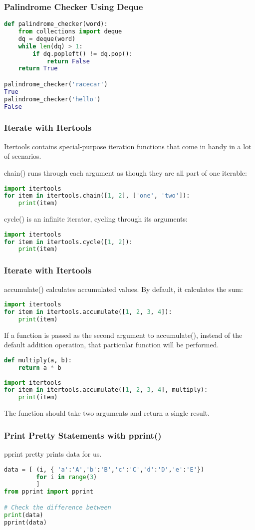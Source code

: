 \documentclass{beamer}
\begin{document}
\begin{frame}[fragile]
\frametitle{Palindrome Checker Using Deque}
\begin{lstlisting}[language=Python]
def palindrome_checker(word):
    from collections import deque
    dq = deque(word)
    while len(dq) > 1:
        if dq.popleft() != dq.pop():
            return False
    return True

palindrome_checker('racecar')
True
palindrome_checker('hello')
False
\end{lstlisting}
\end{frame}

\begin{frame}[fragile]
\frametitle{Iterate with Itertools}
Itertools contains special-purpose iteration functions that come in handy in a lot of scenarios.

chain() runs through each argument as though they are all part of one iterable:

\begin{lstlisting}[language=Python]
import itertools
for item in itertools.chain([1, 2], ['one', 'two']):
	print(item)
\end{lstlisting}

cycle() is an infinite iterator, cycling through its arguments:
\begin{lstlisting}[language=Python]
import itertools
for item in itertools.cycle([1, 2]):
    print(item)
\end{lstlisting}

\end{frame}


\begin{frame}[fragile]
\frametitle{Iterate with Itertools}

accumulate() calculates accumulated values. By default, it calculates the sum:

\begin{lstlisting}[language=Python]
import itertools
for item in itertools.accumulate([1, 2, 3, 4]):
    print(item)
\end{lstlisting}

If a function is passed as the second argument to accumulate(), instead of the default addition operation, that particular function will be performed.
\begin{lstlisting}[language=Python]
def multiply(a, b):
    return a * b
    
import itertools
for item in itertools.accumulate([1, 2, 3, 4], multiply):
    print(item)
\end{lstlisting}
The function should take two arguments and return a single result.
\end{frame}

\begin{frame}[fragile]
\frametitle{Print Pretty Statements with pprint()}
pprint pretty prints data for us.
\begin{lstlisting}[language=Python]
data = [ (i, { 'a':'A','b':'B','c':'C','d':'D','e':'E'})
         for i in range(3)
         ]
from pprint import pprint

# Check the difference between 
print(data)
pprint(data)
\end{lstlisting}
\end{frame}
\end{document}
